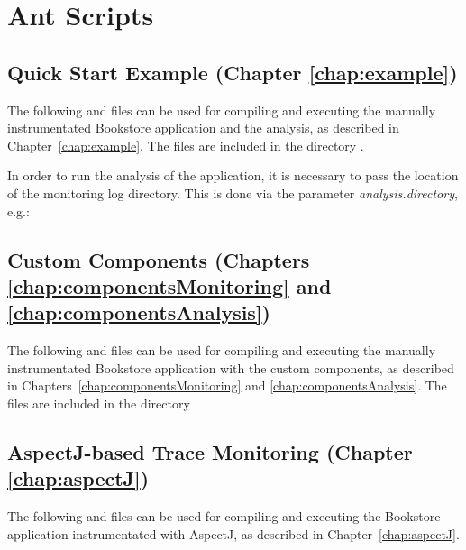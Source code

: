 \chapter{Ant Scripts}
\section{Quick Start Example (Chapter \ref{chap:example})}
The following  and  files can be %
used for compiling and executing the manually instrumentated Bookstore %
application and the analysis, as described in Chapter~\ref{chap:example}. %
The files are included in the directory \file{\manualInstrumentedBookstoreApplicationDirDistro{}/}.

      In order to run the analysis of the application, it is necessary to pass the location of the monitoring log directory. This is done via the parameter \textit{analysis.directory}, e.g.:
      \setBashListing
      

      \setXMLListing
      
      
\newpage
\section{Custom Components (Chapters \ref{chap:componentsMonitoring} and \ref{chap:componentsAnalysis})}
      The following  and  files can be used for compiling and executing the manually instrumentated Bookstore application with the custom components, as described in Chapters~\ref{chap:componentsMonitoring} and \ref{chap:componentsAnalysis}. %
The files are included in the directory \file{\customComponentsBookstoreApplicationDirDistro{}/}.
      \setXMLListing
      
      
\newpage
\section{AspectJ-based Trace Monitoring (Chapter \ref{chap:aspectJ})}
      The following  and  files can be used for compiling and executing the Bookstore application instrumentated with AspectJ, as described in Chapter~\ref{chap:aspectJ}. %


